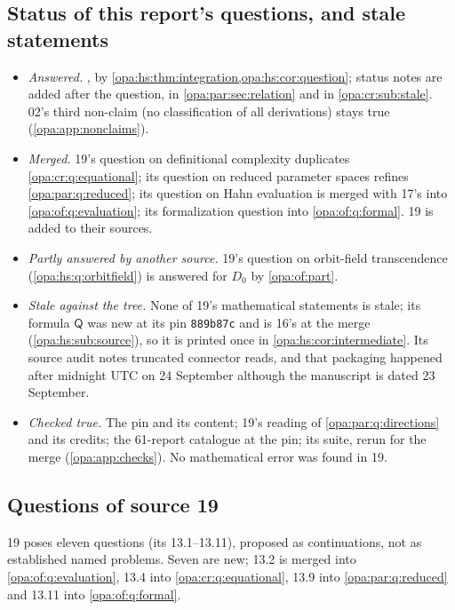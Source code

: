 \documentclass[11pt,oneside]{article}
\numberwithin{equation}{section}
\theoremstyle{definition}
\theoremstyle{remark}
\begin{document}
\subsection{Status of this report's questions, and stale statements}\label{opa:hs:sub:status}

\begin{itemize}[itemsep=2pt]
\item \emph{Answered.} , by \cref{opa:hs:thm:integration,opa:hs:cor:question}; status notes are added after the question,
in \cref{opa:par:sec:relation} and in \cref{opa:cr:sub:stale}. 02's third non-claim (no classification of all derivations) stays true
(\cref{opa:app:nonclaims}).
\item \emph{Merged.} 19's question on definitional complexity duplicates \cref{opa:cr:q:equational}; its question on reduced parameter spaces refines
\cref{opa:par:q:reduced}; its question on Hahn evaluation is merged with 17's into \cref{opa:of:q:evaluation}; its formalization question into
\cref{opa:of:q:formal}. 19 is added to their sources.
\item \emph{Partly answered by another source.} 19's question on orbit-field transcendence (\cref{opa:hs:q:orbitfield}) is answered for $D_0$ by
\cref{opa:of:part}.
\item \emph{Stale against the tree.} None of 19's mathematical statements is stale; its formula $\mathsf Q$ was new at its pin \texttt{889b87c} and is
16's at the merge (\cref{opa:hs:sub:source}), so it is printed once in \cref{opa:hs:cor:intermediate}. Its source audit notes truncated connector
reads, and that packaging happened after midnight UTC on 24 September although the manuscript is dated 23 September.
\item \emph{Checked true.} The pin and its content; 19's reading of \cref{opa:par:q:directions} and its credits; the 61-report catalogue at the pin; its suite,
rerun for the merge (\cref{opa:app:checks}). No mathematical error was found in 19.
\end{itemize}

\subsection{Questions of source 19}\label{opa:hs:sub:questions}

19 poses eleven questions (its 13.1--13.11), proposed as continuations, not as established named problems. Seven are new; 13.2 is merged into
\cref{opa:of:q:evaluation}, 13.4 into \cref{opa:cr:q:equational}, 13.9 into \cref{opa:par:q:reduced} and 13.11 into \cref{opa:of:q:formal}.
\end{document}
